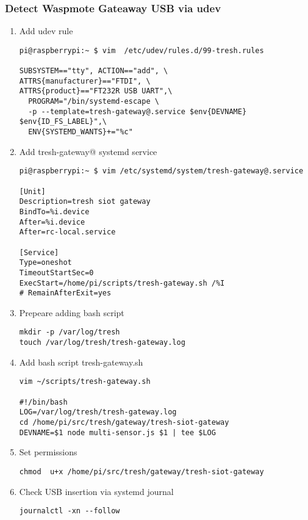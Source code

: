 \subsubsection*{Detect Waspmote Gateaway USB via
udev}\label{detect-waspmote-gateaway-usb-via-udev}

\begin{enumerate}
\def\labelenumi{\arabic{enumi}.}
\item
  Add udev rule

\begin{verbatim}
pi@raspberrypi:~ $ vim  /etc/udev/rules.d/99-tresh.rules

SUBSYSTEM=="tty", ACTION=="add", \
ATTRS{manufacturer}=="FTDI", \
ATTRS{product}=="FT232R USB UART",\
  PROGRAM="/bin/systemd-escape \
  -p --template=tresh-gateway@.service $env{DEVNAME} $env{ID_FS_LABEL}",\
  ENV{SYSTEMD_WANTS}+="%c"
\end{verbatim}
\item
  Add tresh-gateway@ systemd service

\begin{verbatim}
pi@raspberrypi:~ $ vim /etc/systemd/system/tresh-gateway@.service

[Unit]
Description=tresh siot gateway
BindTo=%i.device
After=%i.device
After=rc-local.service

[Service]
Type=oneshot
TimeoutStartSec=0
ExecStart=/home/pi/scripts/tresh-gateway.sh /%I
# RemainAfterExit=yes
\end{verbatim}
\item
  Prepeare adding bash script

\begin{verbatim}
mkdir -p /var/log/tresh
touch /var/log/tresh/tresh-gateway.log
\end{verbatim}
\item
  Add bash script tresh-gateway.sh

\begin{verbatim}
vim ~/scripts/tresh-gateway.sh

#!/bin/bash
LOG=/var/log/tresh/tresh-gateway.log
cd /home/pi/src/tresh/gateway/tresh-siot-gateway
DEVNAME=$1 node multi-sensor.js $1 | tee $LOG
\end{verbatim}
\item
  Set permissions

\begin{verbatim}
chmod  u+x /home/pi/src/tresh/gateway/tresh-siot-gateway
\end{verbatim}
\item
  Check USB insertion via systemd journal

\begin{verbatim}
journalctl -xn --follow
\end{verbatim}
\end{enumerate}

